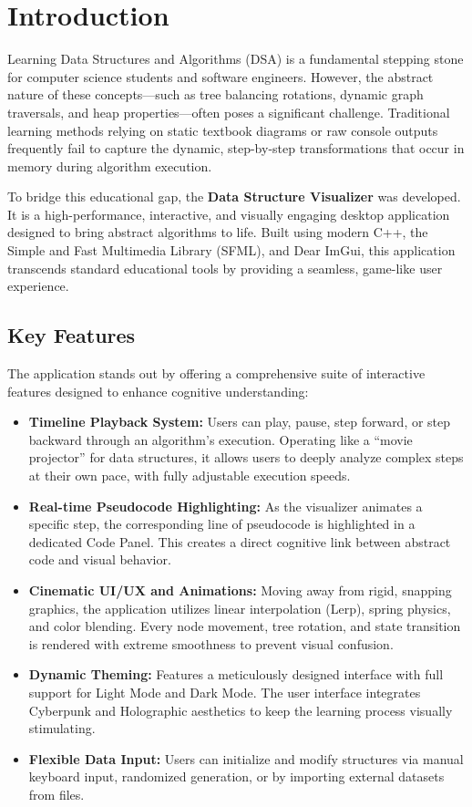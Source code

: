 \section{Introduction}
Learning Data Structures and Algorithms (DSA) is a fundamental stepping stone for computer science students and software engineers. However, the abstract nature of these concepts---such as tree balancing rotations, dynamic graph traversals, and heap properties---often poses a significant challenge. Traditional learning methods relying on static textbook diagrams or raw console outputs frequently fail to capture the dynamic, step-by-step transformations that occur in memory during algorithm execution.

To bridge this educational gap, the \textbf{Data Structure Visualizer} was developed. It is a high-performance, interactive, and visually engaging desktop application designed to bring abstract algorithms to life. Built using modern C++, the Simple and Fast Multimedia Library (SFML), and Dear ImGui, this application transcends standard educational tools by providing a seamless, game-like user experience.

\subsection{Key Features}
The application stands out by offering a comprehensive suite of interactive features designed to enhance cognitive understanding:
\begin{itemize}[leftmargin=*]
    \item \textbf{Timeline Playback System:} Users can play, pause, step forward, or step backward through an algorithm's execution. Operating like a ``movie projector'' for data structures, it allows users to deeply analyze complex steps at their own pace, with fully adjustable execution speeds.
    \item \textbf{Real-time Pseudocode Highlighting:} As the visualizer animates a specific step, the corresponding line of pseudocode is highlighted in a dedicated Code Panel. This creates a direct cognitive link between abstract code and visual behavior.
    \item \textbf{Cinematic UI/UX and Animations:} Moving away from rigid, snapping graphics, the application utilizes linear interpolation (Lerp), spring physics, and color blending. Every node movement, tree rotation, and state transition is rendered with extreme smoothness to prevent visual confusion.
    \item \textbf{Dynamic Theming:} Features a meticulously designed interface with full support for Light Mode and Dark Mode. The user interface integrates Cyberpunk and Holographic aesthetics to keep the learning process visually stimulating.
    \item \textbf{Flexible Data Input:} Users can initialize and modify structures via manual keyboard input, randomized generation, or by importing external datasets from files.
\end{itemize}

